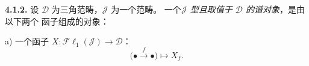 \medskip\noindent\textbf{4.1.2.}\quad
设 $\mathcal D$ 为三角范畴，$\mathcal J$ 为一个范畴。
一个\emph{$\mathcal J$ 型且取值于 $\mathcal D$ 的谱对象}，是由以下两个
函子组成的对象：

a) 一个函子
$X\colon\mathcal{F}\ell_1(\mathcal J)\longrightarrow\mathcal D$：
\[
\bigl(\mathord\bullet\xrightarrow f\mathord\bullet\bigr)\longmapsto X_f.
\]
\endgroup
